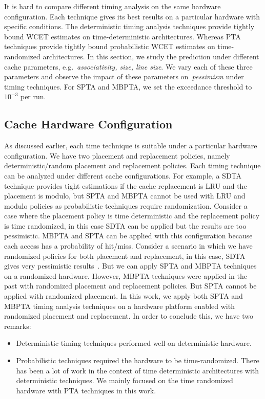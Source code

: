 It is hard to compare different timing analysis on the same hardware configuration. Each technique gives its best results on a particular hardware with specific conditions. The deterministic timing analysis techniques provide tightly bound WCET estimates on time-deterministic architectures. Whereas PTA techniques provide tightly bound probabilistic WCET estimates on time-randomized architectures. In this section, we study the prediction under different cache parameters, e.g.~\textit{associativity, size, line size}. We vary each of these three parameters and observe the impact of these parameters on~\textit{pessimism} under timing techniques. For SPTA and MBPTA, we set the exceedance threshold to $10^{-3}$ per run.

\subsection{Cache Hardware Configuration}

As discussed earlier, each time technique is suitable under a particular hardware configuration. We have two placement and replacement policies, namely deterministic/random placement and replacement policies. Each timing technique can be analyzed under different cache configurations. For example, a SDTA technique provides tight estimations if the cache replacement is LRU and the placement is modulo, but SPTA and MBPTA cannot be used with LRU and modulo policies as probabilistic techniques require  randomization. Consider a case where the placement policy is time deterministic and the replacement policy is time randomized, in this case SDTA can be applied but the results are too pessimistic. MBPTA and SPTA can be applied with this configuration because each access has a probability of hit/miss. Consider a scenario in which we have randomized policies for both placement and replacement, in this case, SDTA gives very pessimistic results~\cite{abella2014comparison}. But we can apply SPTA and MBPTA techniques on a randomized hardware. However, MBPTA techniques were applied in the past with randomized placement and replacement policies. But SPTA cannot be applied with randomized placement. In this work, we apply both SPTA and MBPTA timing analysis techniques on a hardware platform enabled with randomized placement and replacement.  In order to conclude this, we have two  remarks:

\begin{itemize}
\item{Deterministic timing techniques performed well on deterministic hardware}.
\item{Probabilistic techniques required the hardware to be time-randomized. There has been a lot of work in the context of time deterministic architectures with deterministic techniques. We mainly focused on the time randomized hardware with PTA techniques in this work}.
\end{itemize}




